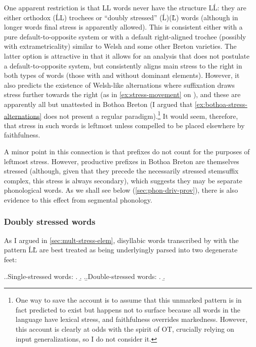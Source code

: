 One apparent restriction is that LL words never have the structure L\'L: they are either orthodox (ĹL) trochees or \enquote{doubly stressed} (Ĺ)(L̀) words (although in longer words final stress is apparently allowed). This is consistent either with a pure default\hyp to\hyp opposite system or with a default right-aligned trochee (possibly with extrametricality) similar to Welsh and some other Breton varieties. The latter option is attractive in that it allows for an analysis that does not postulate a default-to-opposite system, but consistently aligns main stress to the right in both types of words (those with and without dominant elements). However, it also predicts the existence of Welsh-like alternations where suffixation draws stress further towards the right (as in \cref{ex:stress-movement} on ), and these are apparently all but unattested in Bothoa Breton (I argued that \cref{ex:bothoa-stress-alternations} does not present a regular paradigm).\footnote{One way to save the account is to assume that this unmarked pattern is in fact predicted to exist but happens not to surface because all words in the language have lexical stress, and faithfulness overrides markedness. However, this account is clearly at odds with the spirit of OT, crucially relying on input generalizations, so I do not consider it.} It would seem, therefore, that stress in such words is leftmost unless compelled to be placed elsewhere by faithfulness.

A minor point in this connection is that prefixes do not count for the purposes of leftmost stress. However, productive prefixes in Bothoa Breton are themselves stressed (although, given that they precede the necessarily stressed stem\endash suffix complex, this stress is always secondary), which suggests they may be separate phonological words. As we shall see below (\cref{sec:phon-driv-prov}), there is also evidence to this effect from segmental phonology.

\subsubsection{Doubly stressed words}
\label{sec:doubly-stress-words}

As I argued in \cref{sec:mult-stress-elem}, disyllabic words transcribed by \citet{humphreys95:_phonol_bothoa_saint_nicol_pelem} with the pattern ĹL̀ are best treated as being underlyingly parsed into two degenerate feet:

\ex.\a.Single-stressed words:
\a.
\b.
\z.\b.\label{ex:davadou}Double-stressed words:
\a.
\b.

